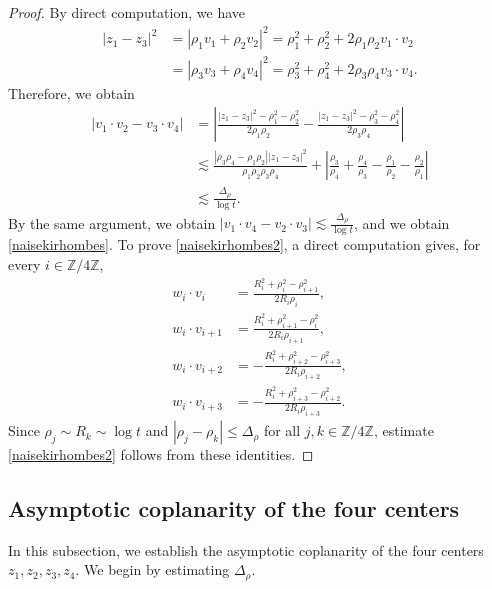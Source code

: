 \documentclass[reqno]{amsart}
\theoremstyle{plain}
\theoremstyle{definition}
\numberwithin{equation}{section}
\begin{document}
\begin{proof}
By direct computation, we have
\begin{align*}
\left|z_1-z_3\right|^2&=\left|\rho_1v_1+\rho_2v_2\right|^2=\rho_1^2+\rho_2^2+2\rho_1\rho_2v_1\cdot v_2
\\
&=\left|\rho_3v_3+\rho_4v_4\right|^2=\rho_3^2+\rho_4^2+2\rho_3\rho_4v_3\cdot v_4.
\end{align*}
Therefore, we obtain
\begin{align*}
\left|v_1\cdot v_2-v_3\cdot v_4\right|&=\left|\frac{|z_1-z_3|^2-\rho_1^2-\rho_2^2}{2\rho_1\rho_2}-\frac{|z_1-z_3|^2-\rho_3^2-\rho_4^2}{2\rho_3\rho_4}\right|
\\
&\lesssim \frac{\left|\rho_3\rho_4-\rho_1\rho_2\right|\left|z_1-z_3\right|^2}{\rho_1\rho_2\rho_3\rho_4}+\left|\frac{\rho_3}{\rho_4}+\frac{\rho_4}{\rho_3}-\frac{\rho_1}{\rho_2}-\frac{\rho_2}{\rho_1}\right|
\\
&\lesssim \frac{\Delta_\rho}{\log{t}}.
\end{align*}
By the same argument, we obtain $\left|v_1\cdot v_4-v_2\cdot v_3\right|\lesssim \frac{\Delta_{\rho}}{\log{t}}$, and we obtain \eqref{naisekirhombes}. To prove \eqref{naisekirhombes2}, a direct computation gives, for every
$i\in\mathbb{Z}/4\mathbb{Z}$,
\begin{align*}
w_i\cdot v_i&=\frac{R_i^2+\rho_i^2-\rho_{i+1}^2}{2R_i\rho_i},
\\
w_i\cdot v_{i+1}&=\frac{R_i^2+\rho_{i+1}^2-\rho_i^2}{2R_i\rho_{i+1}},
\\
w_i\cdot v_{i+2}&=-\frac{R_i^2+\rho_{i+2}^2-\rho_{i+3}^2}{2R_i\rho_{i+2}},
\\
w_i\cdot v_{i+3}&=-\frac{R_i^2+\rho_{i+3}^2-\rho_{i+2}^2}{2R_i\rho_{i+3}}.
\end{align*}
Since $\rho_j\sim R_k\sim\log t$ and $|\rho_j-\rho_k|\leq\Delta_{\rho}$ for all $j,k\in\mathbb{Z}/4\mathbb{Z}$, estimate \eqref{naisekirhombes2} follows from these identities.
\end{proof}



\subsection{Asymptotic coplanarity of the four centers}

In this subsection, we establish the asymptotic coplanarity of the four centers $z_1,z_2,z_3,z_4$. We begin by estimating $\Delta_{\rho}$.
\end{document}
